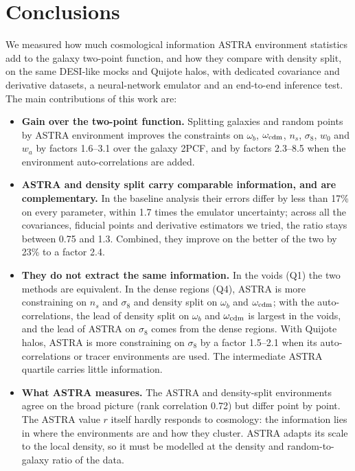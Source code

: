 \section{Conclusions}

We measured how much cosmological information ASTRA environment statistics add to the galaxy two-point function, and how they compare with density split, on the same DESI-like mocks and Quijote halos, with dedicated covariance and derivative datasets, a neural-network emulator and an end-to-end inference test. The main contributions of this work are:
\begin{itemize}
\item \textbf{Gain over the two-point function.} Splitting galaxies and random points by ASTRA environment improves the constraints on $\omega_b$, $\omega_{\rm cdm}$, $n_s$, $\sigma_8$, $w_0$ and $w_a$ by factors 1.6--3.1 over the galaxy 2PCF, and by factors 2.3--8.5 when the environment auto-correlations are added.
\item \textbf{ASTRA and density split carry comparable information, and are complementary.} In the baseline analysis their errors differ by less than 17\% on every parameter, within 1.7 times the emulator uncertainty; across all the covariances, fiducial points and derivative estimators we tried, the ratio stays between 0.75 and 1.3. Combined, they improve on the better of the two by 23\% to a factor 2.4.
\item \textbf{They do not extract the same information.} In the voids (Q1) the two methods are equivalent. In the dense regions (Q4), ASTRA is more constraining on $n_s$ and $\sigma_8$ and density split on $\omega_b$ and $\omega_{\rm cdm}$; with the auto-correlations, the lead of density split on $\omega_b$ and $\omega_{\rm cdm}$ is largest in the voids, and the lead of ASTRA on $\sigma_8$ comes from the dense regions. With Quijote halos, ASTRA is more constraining on $\sigma_8$ by a factor 1.5--2.1 when its auto-correlations or tracer environments are used. The intermediate ASTRA quartile carries little information.
\item \textbf{What ASTRA measures.} The ASTRA and density-split environments agree on the broad picture (rank correlation 0.72) but differ point by point. The ASTRA value $r$ itself hardly responds to cosmology: the information lies in where the environments are and how they cluster. ASTRA adapts its scale to the local density, so it must be modelled at the density and random-to-galaxy ratio of the data.

\end{itemize}
